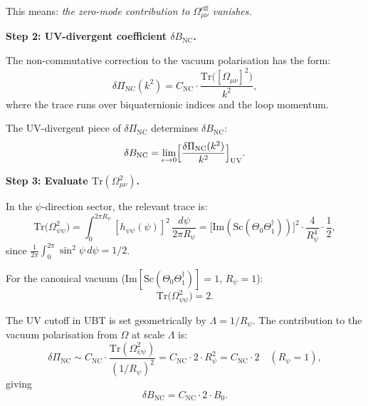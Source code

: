 \documentclass[11pt,a4paper]{article}
\theoremstyle{remark}
\begin{document}
This means: \emph{the zero-mode contribution to $\Omega_{\mu\nu}^{\mathrm{eff}}$ vanishes.}

\textbf{Step 2: UV-divergent coefficient $\delta B_{\mathrm{NC}}$.}

The non-commutative correction to the vacuum polarisation has the form:
\begin{equation}
  \delta \Pi_{\mathrm{NC}}(k^2) = C_{\mathrm{NC}} \cdot
    \frac{\mathrm{Tr}\bigl([\Omega_{\mu\nu}]^2\bigr)}{k^2},
  \label{eq:delta_Pi_NC}
\end{equation}
where the trace runs over biquaternionic indices and the loop momentum.

The UV-divergent piece of $\delta\Pi_{\mathrm{NC}}$ determines $\delta B_{\mathrm{NC}}$:
\begin{equation}
  \delta B_{\mathrm{NC}} = \lim_{\epsilon\to 0} \Bigl[
    \frac{\delta\Pi_{\mathrm{NC}}(k^2)}{k^2}\Bigr]_{\mathrm{UV}}.
  \label{eq:delta_B_NC}
\end{equation}

\textbf{Step 3: Evaluate $\mathrm{Tr}(\Omega_{\mu\nu}^2)$.}

In the $\psi$-direction sector, the relevant trace is:
\begin{equation}
  \mathrm{Tr}\bigl(\Omega_{\psi\psi}^2\bigr) = \int_0^{2\pi R_\psi}
    [h_{\psi\psi}(\psi)]^2\,\frac{d\psi}{2\pi R_\psi}
  = \bigl[\mathrm{Im}(\mathrm{Sc}(\Theta_0\Theta_1^\dagger))\bigr]^2 \cdot
    \frac{4}{R_\psi^4} \cdot \frac{1}{2},
  \label{eq:Tr_Omega_sq}
\end{equation}
since $\frac{1}{2\pi}\int_0^{2\pi}\sin^2\psi\,d\psi = 1/2$.

For the canonical vacuum ($\mathrm{Im}[\mathrm{Sc}(\Theta_0\Theta_1^\dagger)] = 1$, $R_\psi = 1$):
\begin{equation}
  \mathrm{Tr}\bigl(\Omega_{\psi\psi}^2\bigr) = 2.
  \label{eq:Tr_Omega_sq_canonical}
\end{equation}

The UV cutoff in UBT is set geometrically by $\Lambda = 1/R_\psi$. The contribution to the
vacuum polarisation from $\Omega$ at scale $\Lambda$ is:
\begin{equation}
  \delta \Pi_{\mathrm{NC}} \sim C_{\mathrm{NC}} \cdot
    \frac{\mathrm{Tr}(\Omega_{\psi\psi}^2)}{(1/R_\psi)^2}
  = C_{\mathrm{NC}} \cdot 2 \cdot R_\psi^2 = C_{\mathrm{NC}} \cdot 2
  \quad (R_\psi = 1),
  \label{eq:delta_Pi_NC_cutoff}
\end{equation}
giving
\begin{equation}
  \delta B_{\mathrm{NC}} = C_{\mathrm{NC}} \cdot 2 \cdot B_0.
  \label{eq:delta_B_NC_result}
\end{equation}
\end{document}
